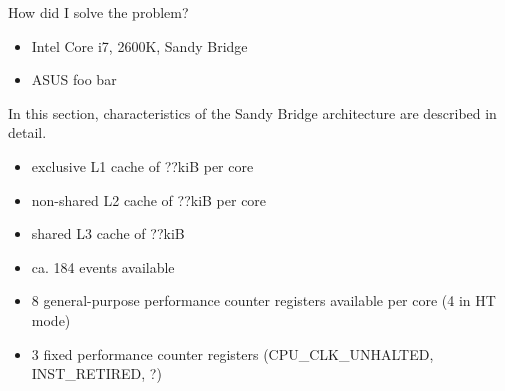 
How did I solve the problem?

\label{sec:hw}


\label{sec:hw-products}

\begin{itemize}

\item Intel Core i7, 2600K, Sandy Bridge

\item ASUS foo bar

\end{itemize}


\label{sec:sandy-bridge}

In this section, characteristics of the Sandy Bridge architecture are described
in detail.



\begin{itemize}

\item exclusive L1 cache of ??kiB per core

\item non-shared L2 cache of ??kiB per core

\item shared L3 cache of ??kiB

\end{itemize}


\label{sec:sandy-bridge-pmu}

\begin{itemize}

\item ca. 184 events available

\item 8 general-purpose performance counter registers available per core (4 in
      HT mode)

\item 3 fixed performance counter registers (CPU\_CLK\_UNHALTED, INST\_RETIRED,
      ?)

\end{itemize}



